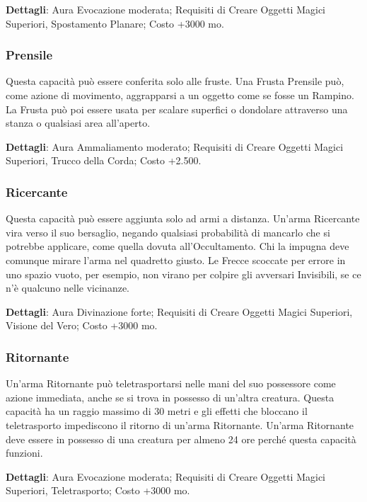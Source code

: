 \begin{multicols}{2}
\textbf{Dettagli}: Aura Evocazione moderata; Requisiti di Creare Oggetti Magici Superiori, Spostamento Planare; Costo +3000 mo.

\subsubsection{Prensile}

Questa capacità può essere conferita solo alle fruste. Una Frusta Prensile può, come azione di movimento, aggrapparsi a un oggetto come se fosse un Rampino. La Frusta può poi essere usata per scalare superfici o dondolare attraverso una stanza o qualsiasi area all'aperto. 

\textbf{Dettagli}: Aura Ammaliamento moderato; Requisiti di Creare Oggetti Magici Superiori, Trucco della Corda; Costo +2.500.

\subsubsection{Ricercante}

Questa capacità può essere aggiunta solo ad armi a distanza. Un'arma Ricercante vira verso il suo bersaglio, negando qualsiasi probabilità di mancarlo che si potrebbe applicare, come quella dovuta all'Occultamento. Chi la impugna deve comunque mirare l'arma nel quadretto giusto. Le Frecce scoccate per errore in uno spazio vuoto, per esempio, non virano per colpire gli avversari Invisibili, se ce n'è qualcuno nelle vicinanze.

\textbf{Dettagli}: Aura Divinazione forte; Requisiti di Creare Oggetti Magici Superiori, Visione del Vero; Costo +3000 mo.

\subsubsection{Ritornante}

Un'arma Ritornante può teletrasportarsi nelle mani del suo possessore come azione immediata, anche se si trova in possesso di un'altra creatura. Questa capacità ha un raggio massimo di 30 metri e gli effetti che bloccano il teletrasporto impediscono il ritorno di un'arma Ritornante. Un'arma Ritornante deve essere in possesso di una creatura per almeno 24 ore perché questa capacità funzioni.

\textbf{Dettagli}: Aura Evocazione moderata; Requisiti di Creare Oggetti Magici Superiori, Teletrasporto; Costo +3000 mo.


\end{multicols}
